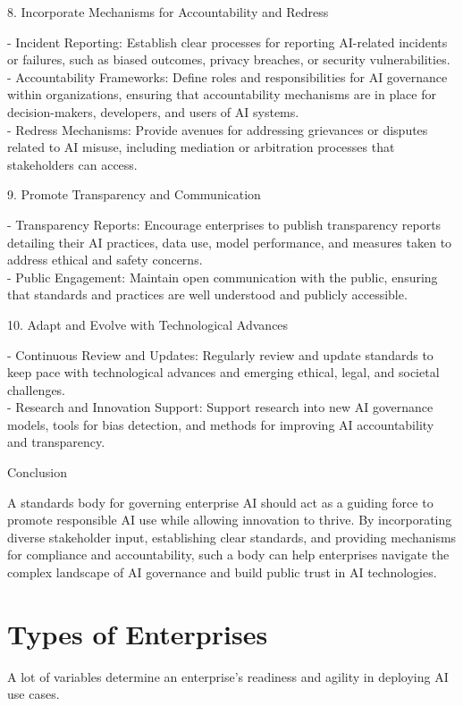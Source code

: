 8. Incorporate Mechanisms for Accountability and Redress

- Incident Reporting: Establish clear processes for reporting AI-related
incidents or failures, such as biased outcomes, privacy breaches, or
security vulnerabilities.\\
- Accountability Frameworks: Define roles and responsibilities for AI
governance within organizations, ensuring that accountability mechanisms
are in place for decision-makers, developers, and users of AI systems.\\
- Redress Mechanisms: Provide avenues for addressing grievances or
disputes related to AI misuse, including mediation or arbitration
processes that stakeholders can access.

9. Promote Transparency and Communication

- Transparency Reports: Encourage enterprises to publish transparency
reports detailing their AI practices, data use, model performance, and
measures taken to address ethical and safety concerns.\\
- Public Engagement: Maintain open communication with the public,
ensuring that standards and practices are well understood and publicly
accessible.

10. Adapt and Evolve with Technological Advances

- Continuous Review and Updates: Regularly review and update standards
to keep pace with technological advances and emerging ethical, legal,
and societal challenges.\\
- Research and Innovation Support: Support research into new AI
governance models, tools for bias detection, and methods for improving
AI accountability and transparency.

Conclusion

A standards body for governing enterprise AI should act as a guiding
force to promote responsible AI use while allowing innovation to thrive.
By incorporating diverse stakeholder input, establishing clear
standards, and providing mechanisms for compliance and accountability,
such a body can help enterprises navigate the complex landscape of AI
governance and build public trust in AI technologies.

\section{Types of Enterprises}\label{types-of-enterprises}

A lot of variables determine an enterprise's readiness and agility in
deploying AI use cases.

